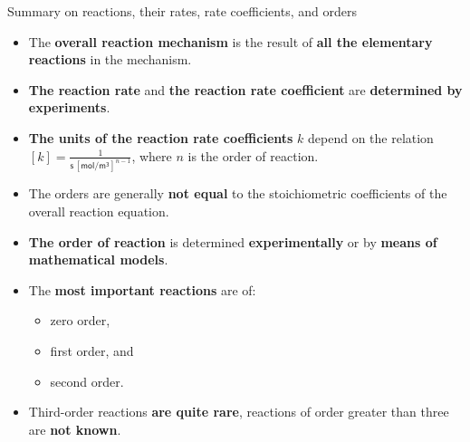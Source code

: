 \begin{frame}[<+->]{Summary on reactions, their rates, rate coefficients, and orders}
	\small
	\begin{itemize}
		\item The \alert{\bf overall reaction mechanism} is the result of {\bf all the elementary reactions} in the mechanism.
		\item {\bf The reaction rate} and {\bf the reaction rate coefficient} are \alert{\bf determined by experiments}.
		\item \alert{\bf The units of the reaction rate coefficients} $k$ depend on the relation 
		$[k] = \tfrac{1}{\mathsf{s \, [mol/m^3]}^{n-1}}$, where $n$ is the order of reaction. \\
		\item The orders are generally \alert{\bf not equal} to the stoichiometric coefficients of the overall
		reaction equation.
		\item {\bf The order of reaction} is determined \alert{\bf experimentally} or by \alert{\bf means of mathematical models}.
		\item The \alert{\bf most important reactions} are of: 
		\begin{itemize}
			\item zero order, 
			\item first order, and 
			\item second order.
		\end{itemize}
		\item Third-order reactions {\bf are quite rare}, reactions of order greater than three are {\bf not known}.
		
	\end{itemize}
\end{frame}
%
